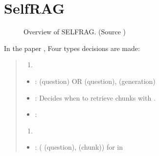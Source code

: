 \documentclass[letterpaper,11pt,english]{sphinxmanual}
\begin{document}
\section{Self\sphinxhyphen{}RAG}
\label{\detokenize{rag:self-rag}}\label{\detokenize{rag:ch-self-rag}}
\begin{figure}[htbp]
\centering
\capstart

\noindent{}
\caption{Overview of SELF\sphinxhyphen{}RAG. (Source )}\label{\detokenize{rag:id57}}\label{\detokenize{rag:fig-self-rag-paper}}\end{figure}

\sphinxAtStartPar
In the paper , Four types decisions are made:
\begin{quote}
\begin{enumerate}
%
\item {} 
\sphinxAtStartPar
{}

\end{enumerate}
\begin{itemize}
\item {} 
\sphinxAtStartPar
{}:
\sphinxhyphen{}  (question)
\sphinxhyphen{} OR  (question),  (generation)

\item {} 
\sphinxAtStartPar
{}:
Decides when to retrieve  chunks with .

\item {} 
\sphinxAtStartPar
{}:
\sphinxhyphen{} 
\sphinxhyphen{} 
\sphinxhyphen{} 

\end{itemize}
\begin{enumerate}
%
\setcounter{enumi}{1}
\item {} 
\sphinxAtStartPar
{}

\end{enumerate}
\begin{itemize}
\item {} 
\sphinxAtStartPar
{}:
\sphinxhyphen{} ( (question),  (chunk)) for  in 


\end{itemize}
\end{quote}
\end{document}
